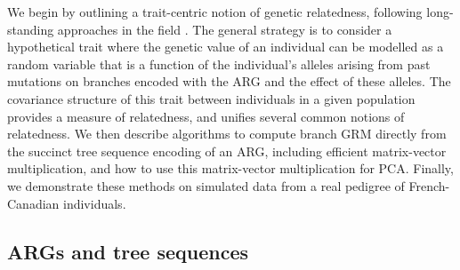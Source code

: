 


We begin by outlining a trait-centric notion of genetic relatedness,
following long-standing approaches in the field
\citep{fisher1919correlation, wright1922coefficients}.
%
The general strategy is to consider a hypothetical trait where the genetic value
of an individual can be modelled as a random variable that is a function
of the individual's alleles arising from past mutations on branches encoded with the ARG
and the effect of these alleles.
%
The covariance structure of this trait between individuals in a given
population provides a measure of relatedness, and unifies several common notions of relatedness.
%
We then describe algorithms to compute branch GRM
directly from the succinct tree sequence encoding of an ARG,
including efficient matrix-vector multiplication, and
how to use this matrix-vector multiplication for PCA.
%
Finally, we demonstrate these methods on
simulated data from a real pedigree of French-Canadian individuals.

\subsection{ARGs and tree sequences}

